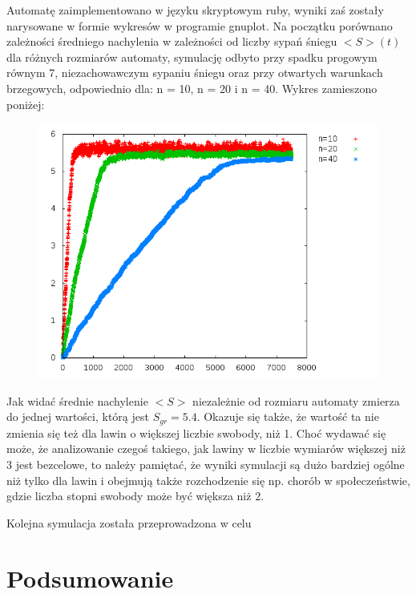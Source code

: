 \documentclass{article}
\begin{document}
	Automatę zaimplementowano w języku skryptowym ruby, wyniki zaś zostały narysowane w formie wykresów w programie gnuplot. Na początku porównano zależności średniego nachylenia w zależności od liczby sypań śniegu $<S>(t)$ dla różnych rozmiarów automaty, symulację odbyto przy spadku progowym równym 7, niezachowawczym sypaniu śniegu oraz przy otwartych warunkach brzegowych, odpowiednio dla: n = 10, n = 20 i n = 40. Wykres zamieszono poniżej: 
		\begin{figure}[h]
			\begin{center}
				\includegraphics [bb = 0 0 340 318, scale=0.5] {average_slope_threshold_7.png}
			\end{center}
		\end{figure}
\newpage
	Jak widać średnie nachylenie $<S>$ niezależnie od rozmiaru automaty zmierza do jednej wartości, którą jest $S_{gr} = 5.4$. Okazuje się także, że wartość ta nie zmienia się też dla lawin o większej liczbie swobody, niż 1. Choć wydawać się może, że analizowanie czegoś takiego, jak lawiny w liczbie wymiarów większej niż 3 jest bezcelowe, to należy pamiętać, że wyniki symulacji są dużo bardziej ogólne niż tylko dla lawin i obejmują także rozchodzenie się np. chorób w społeczeństwie, gdzie liczba stopni swobody może być większa niż 2. 

	Kolejna symulacja została przeprowadzona w celu 

	

\section{Podsumowanie}
\end{document}
